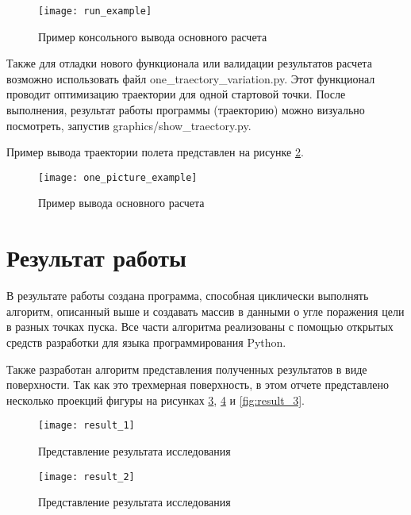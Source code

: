 \begin{figure}[!h]
\begin{center}
	\texttt{[image: run\_example]}
	\caption{Пример консольного вывода основного расчета}
	\label{fig:run_example}
\end{center}
\end{figure}

Также для отладки нового функционала или валидации результатов расчета возможно использовать файл one\_traectory\_variation.py. Этот функционал проводит оптимизацию траектории для одной стартовой точки. После выполнения, результат работы программы (траекторию) можно визуально посмотреть, запустив graphics/show\_traectory.py.

Пример вывода траектории полета представлен на рисунке \ref{fig:one_picture_example}.
\begin{figure}[!h]
\begin{center}
	\texttt{[image: one\_picture\_example]}
	\caption{Пример вывода основного расчета}
	\label{fig:one_picture_example}
\end{center}
\end{figure}


\clearpage
\section{Результат работы}
В результате работы создана программа, способная циклически выполнять алгоритм, описанный выше и создавать массив в данными о угле поражения цели в разных точках пуска. Все части алгоритма реализованы с помощью открытых средств разработки для языка программирования Python.

Также разработан алгоритм представления полученных результатов в виде поверхности. Так как это трехмерная поверхность, в этом отчете представлено несколько проекций фигуры на рисунках \ref{fig:result_1}, \ref{fig:result_2} и \ref{fig:result_3}.

\begin{figure}[!h]
\begin{center}
	\texttt{[image: result\_1]}
	\caption{Представление результата исследования}
	\label{fig:result_1}
\end{center}
\end{figure}

\begin{figure}[!h]
\begin{center}
	\texttt{[image: result\_2]}
	\caption{Представление результата исследования}
	\label{fig:result_2}
\end{center}
\end{figure}

